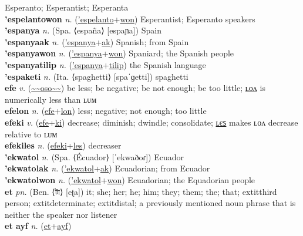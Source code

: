 Esperanto; Esperantist; Esperanta \label{'espelantoak} \\
\textbf{'espelantowon} \textit{n.} (\hyperref['espelanto]{'espelanto}+\hyperref[won]{won})
Esperantist; Esperanto speakers \label{'espelantowon} \\
\textbf{'espanya} \textit{n.} (Spa. ⟨españa⟩ [espaɲa])
Spain \label{'espanya} \\
\textbf{'espanyaak} \textit{n.} (\hyperref['espanya]{'espanya}+\hyperref[ak]{ak})
Spanish; from Spain \label{'espanyaak} \\
\textbf{'espanyawon} \textit{n.} (\hyperref['espanya]{'espanya}+\hyperref[won]{won})
Spaniard; the Spanish people \label{'espanyawon} \\
\textbf{'espanyatilip} \textit{n.} (\hyperref['espanya]{'espanya}+\hyperref[tilip]{tilip})
the Spanish language \label{'espanyatilip} \\
\textbf{'espaketi} \textit{n.} (Ita. ⟨spaghetti⟩ [spaˈɡetti])
spaghetti \label{'espaketi} \\
\textbf{efe} \textit{v.} (\hyperref[oso]{\~{}\~{}oso\~{}\~{}})
be less; be negative; be not enough; be too little; \hyperref[efelon]{ʟᴏᴧ} is numerically less than ʟᴜᴍ \label{efe} \\
\textbf{efelon} \textit{n.} (\hyperref[efe]{efe}+\hyperref[lon]{lon})
less; negative; not enough; too little \label{efelon} \\
\textbf{efeki} \textit{v.} (\hyperref[efe]{efe}+\hyperref[ki]{ki})
decrease; diminish; dwindle; consolidate; \hyperref[efekiles]{ʟєꜱ} makes ʟᴏᴧ decrease relative to ʟᴜᴍ \label{efeki} \\
\textbf{efekiles} \textit{n.} (\hyperref[efeki]{efeki}+\hyperref[les]{les})
decreaser \label{efekiles} \\
\textbf{'ekwatol} \textit{n.} (Spa. ⟨Écuador⟩ [ˈekwaðoɾ])
Ecuador \label{'ekwatol} \\
\textbf{'ekwatolak} \textit{n.} (\hyperref['ekwatol]{'ekwatol}+\hyperref[ak]{ak})
Ecuadorian; from Ecuador \label{'ekwatolak} \\
\textbf{'ekwatolwon} \textit{n.} (\hyperref['ekwatol]{'ekwatol}+\hyperref[won]{won})
Ecuadorian; the Equadorian people \label{'ekwatolwon} \\
\textbf{et} \textit{pn.} (Ben. ⟨টা⟩ [eʈa])
it; she; her; he; him; they; them; the; that; 	extit{third person}; 	extit{determinate}; 	extit{distal}; a previously mentioned noun phrase that is neither the speaker nor listener \label{et} \\
\textbf{et ayf} \textit{n.} (\hyperref[et]{et}+\hyperref[yf]{ayf})
